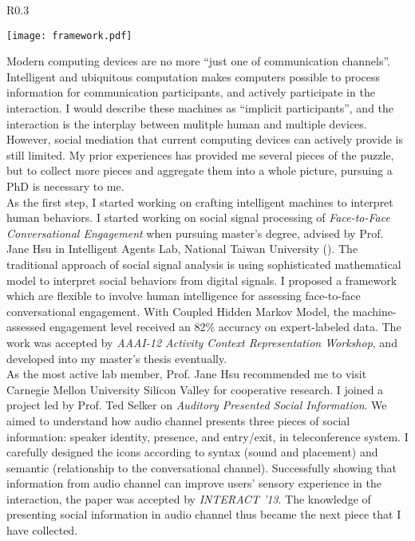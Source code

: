 \begin{wrapfigure}{R}{0.3\textwidth}
  \begin{center}
  \texttt{[image: framework.pdf]}
  \label{fig:framework}
  \end{center}
\end{wrapfigure}

\noindent
Modern computing devices are no more ``just one of communication channels''.
Intelligent and ubiquitous computation makes computers possible to process information for communication participants,
and actively participate in the interaction.
I would describe these machines as ``implicit participants'',
and the interaction is the interplay between mulitple human and multiple devices.
However, social mediation that current computing devices can actively provide is still limited.
My prior experiences has provided me several pieces of the puzzle,
but to collect more pieces and aggregate them into a whole picture, 
pursuing a PhD is necessary to me.\\

\noindent
As the first step, I started working on crafting intelligent machines to interpret human behaviors.
I started working on social signal processing of \textit{Face-to-Face Conversational Engagement} when pursuing master's degree,
advised by Prof. Jane Hsu in Intelligent Agents Lab, National Taiwan University ().
The traditional approach of social signal analysis is using sophisticated mathematical model to interpret social behaviors from digital signals.
I proposed a framework which are flexible to involve human intelligence for assessing face-to-face conversational engagement.
With Coupled Hidden Markov Model, 
the machine-assessed engagement level received an 82\% accuracy on expert-labeled data. 
The work was accepted by \textit{AAAI-12 Activity Context Representation Workshop}, and developed into my master's thesis eventually.\\

\noindent
As the most active lab member,
Prof. Jane Hsu recommended me to visit Carnegie Mellon University Silicon Valley for cooperative research.
I joined a project led by Prof. Ted Selker on \textit{Auditory Presented Social Information}.
We aimed to understand how audio channel presents three pieces of social information: 
speaker identity, presence, and entry/exit, in teleconference system.
I carefully designed the icons according to syntax (sound and placement) and semantic (relationship to the conversational channel).
Successfully showing that information from audio channel can improve users' sensory experience in the interaction, 
the paper was accepted by \textit{INTERACT '13}. 
The knowledge of presenting social information in audio channel thus became the next piece that I have collected. \\


